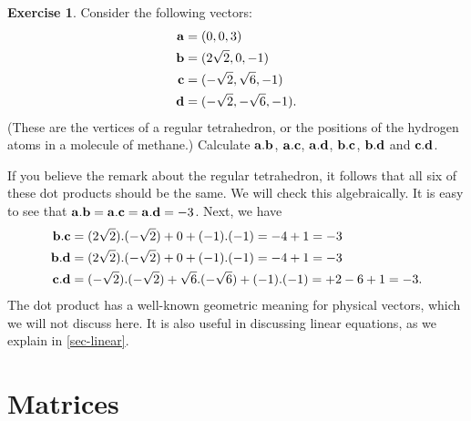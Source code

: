\documentclass[a4paper]{book}
\theoremstyle{definition}
\newtheorem{exercise}[theorem]{Exercise}
\renewenvironment{solution}{\SolutionInline}{\endSolutionInline}
\begin{document}
\begin{exercise}
 Consider the following vectors:
 \begin{align*}
  \mathbf{a} &= (0,0,3) \\
  \mathbf{b} &= (2\sqrt{2},0,-1) \\
  \mathbf{c} &= (-\sqrt{2},\sqrt{6},-1) \\
  \mathbf{d} &= (-\sqrt{2},-\sqrt{6},-1).
 \end{align*}
 (These are the vertices of a regular tetrahedron, or the positions of
 the hydrogen atoms in a molecule of methane.)  Calculate
 $\mathbf{a}.\mathbf{b}$,  $\mathbf{a}.\mathbf{c}$,  $\mathbf{a}.\mathbf{d}$,
 $\mathbf{b}.\mathbf{c}$,  $\mathbf{b}.\mathbf{d}$ and  $\mathbf{c}.\mathbf{d}$.
\end{exercise}
\begin{solution}
 If you believe the remark about the regular tetrahedron, it follows
 that all six of these dot products should be the same.  We will check
 this algebraically.  It is easy to see that 
 $\mathbf{a}.\mathbf{b}=\mathbf{a}.\mathbf{c}=\mathbf{a}.\mathbf{d}=-3$.  Next, we have
 \begin{align*}
  \mathbf{b}.\mathbf{c} &= (2\sqrt{2}).(-\sqrt{2}) + 0 + (-1).(-1) = -4+1 = -3 \\
  \mathbf{b}.\mathbf{d} &= (2\sqrt{2}).(-\sqrt{2}) + 0 + (-1).(-1) = -4+1 = -3 \\
  \mathbf{c}.\mathbf{d} &= (-\sqrt{2}).(-\sqrt{2}) + \sqrt{6}.(-\sqrt{6}) + (-1).(-1) =
                     +2-6+1 = -3.
 \end{align*}
\end{solution}
The dot product has a well-known geometric meaning for physical
vectors, which we will not discuss here.  It is also useful in
discussing linear equations, as we explain in \autoref{sec-linear}.

\section{Matrices}
\label{sec-matrices}
\end{document}
